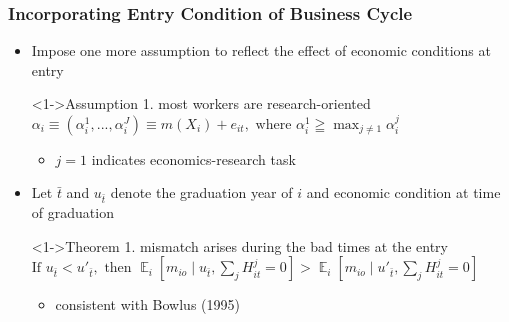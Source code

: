 \documentclass[11pt]{beamer}
\begin{document}
\begin{frame}
	\frametitle{Incorporating Entry Condition of Business Cycle}
	\begin{itemize}
		\item Impose one more assumption to reflect the effect of economic conditions at entry
		\begin{block}<1->{Assumption 1. most workers are research-oriented}
			$\alpha_{i}\equiv \left( \alpha_{i}^1,...,\alpha_{i}^J\right) \equiv m(X_i)+e_{it}, \text{ where }  \alpha_{i}^1 \geqq \max_{j\ne 1} \alpha_{i}^j $  
		\end{block}
	\begin{itemize}
		\item $j=1$ indicates economics-research task 
	\end{itemize}
\vspace{1 mm}
        \item Let $\bar{t}$ and $u_{\bar{t}}$  denote the graduation year of $i$ and economic condition at time of graduation 
		\begin{block}<1->{Theorem 1. mismatch arises during the bad times at the entry}
		$\text{If } u_{\bar{t}}< u'_{\bar{t}},\text{ then }\mathop{{}\mathbb{E}}_{i}\left[ m_{io} \mid u_{\bar{t}}, \sum_{j} H_{it}^{j} = 0 \right] > \mathop{{}\mathbb{E}}_{i}\left[ m_{io} \mid u'_{\bar{t}}, \sum_{j} H_{it}^{j} = 0 \right]$
		\end{block}
		\begin{itemize}
			\item consistent with Bowlus (1995)
		\end{itemize}
	\end{itemize}
\end{frame}
\end{document}
